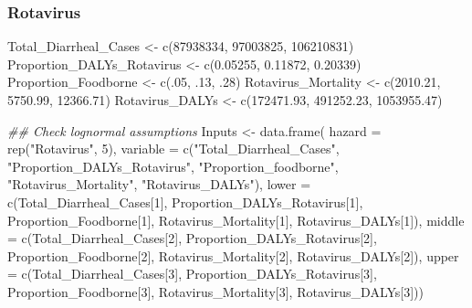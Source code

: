 \documentclass[
  letterpaper,
  DIV=11,
  numbers=noendperiod]{scrartcl}
\newenvironment{Shaded}{\begin{snugshade}}{\end{snugshade}}
\newcommand{\AttributeTok}[1]{\textcolor[rgb]{0.40,0.45,0.13}{#1}}
\newcommand{\DecValTok}[1]{\textcolor[rgb]{0.68,0.00,0.00}{#1}}
\newcommand{\DocumentationTok}[1]{\textcolor[rgb]{0.37,0.37,0.37}{\textit{#1}}}
\newcommand{\FloatTok}[1]{\textcolor[rgb]{0.68,0.00,0.00}{#1}}
\newcommand{\FunctionTok}[1]{\textcolor[rgb]{0.28,0.35,0.67}{#1}}
\newcommand{\NormalTok}[1]{\textcolor[rgb]{0.00,0.23,0.31}{#1}}
\newcommand{\OtherTok}[1]{\textcolor[rgb]{0.00,0.23,0.31}{#1}}
\newcommand{\StringTok}[1]{\textcolor[rgb]{0.13,0.47,0.30}{#1}}
\begin{document}
\subsubsection{Rotavirus}\label{rotavirus}

\begin{Shaded}
\begin{Highlighting}[]
\NormalTok{Total\_Diarrheal\_Cases }\OtherTok{\textless{}{-}} \FunctionTok{c}\NormalTok{(}\DecValTok{87938334}\NormalTok{, }\DecValTok{97003825}\NormalTok{, }\DecValTok{106210831}\NormalTok{)}
\NormalTok{Proportion\_DALYs\_Rotavirus }\OtherTok{\textless{}{-}} \FunctionTok{c}\NormalTok{(}\FloatTok{0.05255}\NormalTok{, }\FloatTok{0.11872}\NormalTok{, }\FloatTok{0.20339}\NormalTok{)}
\NormalTok{Proportion\_Foodborne }\OtherTok{\textless{}{-}} \FunctionTok{c}\NormalTok{(.}\DecValTok{05}\NormalTok{, .}\DecValTok{13}\NormalTok{, .}\DecValTok{28}\NormalTok{)}
\NormalTok{Rotavirus\_Mortality }\OtherTok{\textless{}{-}} \FunctionTok{c}\NormalTok{(}\FloatTok{2010.21}\NormalTok{, }\FloatTok{5750.99}\NormalTok{, }\FloatTok{12366.71}\NormalTok{)}
\NormalTok{Rotavirus\_DALYs }\OtherTok{\textless{}{-}} \FunctionTok{c}\NormalTok{(}\FloatTok{172471.93}\NormalTok{,  }\FloatTok{491252.23}\NormalTok{,  }\FloatTok{1053955.47}\NormalTok{)}

\DocumentationTok{\#\# Check lognormal assumptions}
\NormalTok{Inputs }\OtherTok{\textless{}{-}} \FunctionTok{data.frame}\NormalTok{(}
 \AttributeTok{hazard =} \FunctionTok{rep}\NormalTok{(}\StringTok{"Rotavirus"}\NormalTok{,  }\DecValTok{5}\NormalTok{), }
 \AttributeTok{variable =} \FunctionTok{c}\NormalTok{(}\StringTok{"Total\_Diarrheal\_Cases"}\NormalTok{,  }\StringTok{"Proportion\_DALYs\_Rotavirus"}\NormalTok{,  }\StringTok{"Proportion\_foodborne"}\NormalTok{,  }\StringTok{"Rotavirus\_Mortality"}\NormalTok{,  }\StringTok{"Rotavirus\_DALYs"}\NormalTok{), }
 \AttributeTok{lower =} \FunctionTok{c}\NormalTok{(Total\_Diarrheal\_Cases[}\DecValTok{1}\NormalTok{],  Proportion\_DALYs\_Rotavirus[}\DecValTok{1}\NormalTok{],  Proportion\_Foodborne[}\DecValTok{1}\NormalTok{],  Rotavirus\_Mortality[}\DecValTok{1}\NormalTok{],  Rotavirus\_DALYs[}\DecValTok{1}\NormalTok{]), }
 \AttributeTok{middle =} \FunctionTok{c}\NormalTok{(Total\_Diarrheal\_Cases[}\DecValTok{2}\NormalTok{],  Proportion\_DALYs\_Rotavirus[}\DecValTok{2}\NormalTok{],  Proportion\_Foodborne[}\DecValTok{2}\NormalTok{],  Rotavirus\_Mortality[}\DecValTok{2}\NormalTok{],  Rotavirus\_DALYs[}\DecValTok{2}\NormalTok{]), }
 \AttributeTok{upper =} \FunctionTok{c}\NormalTok{(Total\_Diarrheal\_Cases[}\DecValTok{3}\NormalTok{],  Proportion\_DALYs\_Rotavirus[}\DecValTok{3}\NormalTok{],  Proportion\_Foodborne[}\DecValTok{3}\NormalTok{],  Rotavirus\_Mortality[}\DecValTok{3}\NormalTok{],  Rotavirus\_DALYs[}\DecValTok{3}\NormalTok{]))}


\end{Highlighting}
\end{Shaded}
\end{document}
